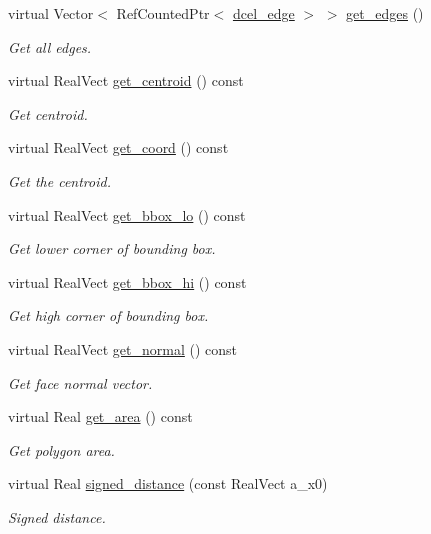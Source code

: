 \begin{DoxyCompactItemize}
virtual Vector$<$ Ref\+Counted\+Ptr$<$ \hyperlink{classdcel__edge}{dcel\+\_\+edge} $>$ $>$ \hyperlink{classdcel__poly_a436b0e3d22a9998b940c00be3d13e8a9}{get\+\_\+edges} ()
\begin{DoxyCompactList}\small\item\em Get all edges. \end{DoxyCompactList}\item 
virtual Real\+Vect \hyperlink{classdcel__poly_a1da003a8bbe8321c07fddcf5ea4fb359}{get\+\_\+centroid} () const 
\begin{DoxyCompactList}\small\item\em Get centroid. \end{DoxyCompactList}\item 
virtual Real\+Vect \hyperlink{classdcel__poly_a249aa5de9c218e0b77fccbb4d3be3674}{get\+\_\+coord} () const 
\begin{DoxyCompactList}\small\item\em Get the centroid. \end{DoxyCompactList}\item 
virtual Real\+Vect \hyperlink{classdcel__poly_a01512cdff4bc2666acf7589f37c61e87}{get\+\_\+bbox\+\_\+lo} () const 
\begin{DoxyCompactList}\small\item\em Get lower corner of bounding box. \end{DoxyCompactList}\item 
virtual Real\+Vect \hyperlink{classdcel__poly_a7ed74c2b8f55ad807f72eb5d5ca06c24}{get\+\_\+bbox\+\_\+hi} () const 
\begin{DoxyCompactList}\small\item\em Get high corner of bounding box. \end{DoxyCompactList}\item 
virtual Real\+Vect \hyperlink{classdcel__poly_aaa9d83dc16a33aadcb6dc07ecb8de953}{get\+\_\+normal} () const 
\begin{DoxyCompactList}\small\item\em Get face normal vector. \end{DoxyCompactList}\item 
virtual Real \hyperlink{classdcel__poly_ab30552f7c156a39a21fd8b0573e79e17}{get\+\_\+area} () const 
\begin{DoxyCompactList}\small\item\em Get polygon area. \end{DoxyCompactList}\item 
virtual Real \hyperlink{classdcel__poly_a15e0edd225bb5ba2cfb232a0dfc7e0b1}{signed\+\_\+distance} (const Real\+Vect a\+\_\+x0)
\begin{DoxyCompactList}\small\item\em Signed distance. \end{DoxyCompactList}\end{DoxyCompactItemize}
